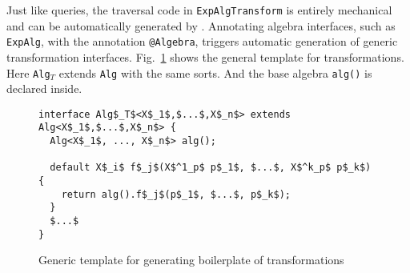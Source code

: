 Just like queries, the traversal code in \lstinline{ExpAlgTransform}
is entirely mechanical and can be automatically generated by \Name.
Annotating algebra interfaces, such as \lstinline{ExpAlg}, with the
annotation \lstinline{@Algebra}, triggers automatic generation of
generic transformation interfaces. Fig.~\ref{trafoTemplate} shows
the general template for transformations. Here
\lstinline{Alg}$_T$ extends \lstinline{Alg} with the same sorts. And
the base algebra \lstinline{alg()} is declared inside.

\begin{figure}[t]
\begin{lstlisting}[mathescape=true]
interface Alg$_T$<X$_1$,$...$,X$_n$> extends Alg<X$_1$,$...$,X$_n$> {
  Alg<X$_1$, ..., X$_n$> alg();

  default X$_i$ f$_j$(X$^1_p$ p$_1$, $...$, X$^k_p$ p$_k$) {
    return alg().f$_j$(p$_1$, $...$, p$_k$);
  }
  $...$
}
\end{lstlisting}
\caption{Generic template for generating boilerplate of transformations}
\label{trafoTemplate}
\end{figure}





